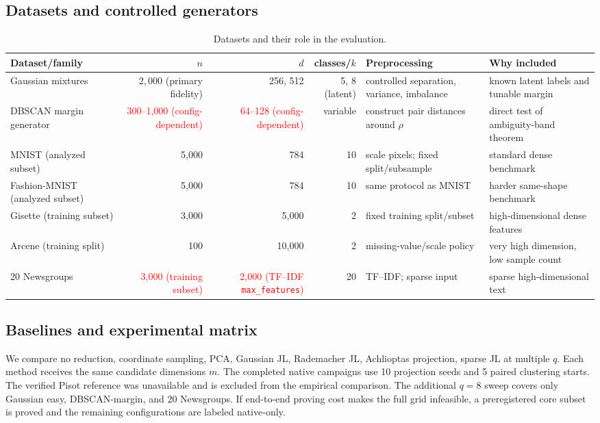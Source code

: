 \documentclass[pdflatex,sn-mathphys-num,iicol]{sn-jnl}
\newcommand{\newtext}[1]{\textcolor{red}{#1}}
\newcommand{\tpexplain}[1]{}
\theoremstyle{plain}
\theoremstyle{definition}
\theoremstyle{remark}
\begin{document}
\subsection{Datasets and controlled generators}
\begin{table}[!htbp]
\caption{Datasets and their role in the evaluation.}\label{tab:datasets-a}
\centering\scriptsize
\begin{adjustbox}{max width=\textwidth}
\begin{tabularx}{\textwidth}{@{}Y R R R Y Y@{}}
\toprule
Dataset/family & $n$ & $d$ & classes/$k$ & Preprocessing & Why included \\
\midrule
Gaussian mixtures & $2{,}000$ (primary fidelity) & 256, 512 & 5, 8 (latent) & controlled separation, variance, imbalance & known latent labels and tunable margin \\
DBSCAN margin generator & \newtext{300--1{,}000 (config-dependent)} & \newtext{64--128 (config-dependent)} & variable & construct pair distances around $\rho$ & direct test of ambiguity-band theorem \\
MNIST (analyzed subset) & 5,000 & 784 & 10 & scale pixels; fixed split/subsample & standard dense benchmark \\
Fashion-MNIST (analyzed subset) & 5,000 & 784 & 10 & same protocol as MNIST & harder same-shape benchmark \\
Gisette (training subset) & 3,000 & 5,000 & 2 & fixed training split/subset & high-dimensional dense features \\
Arcene (training split) & 100 & 10,000 & 2 & missing-value/scale policy & very high dimension, low sample count \\
20 Newsgroups & \newtext{3,000 (training subset)} & \newtext{2,000 (TF--IDF \texttt{max\_features})} & 20 & TF--IDF; sparse input & sparse high-dimensional text \\
\bottomrule
\end{tabularx}
\end{adjustbox}
\end{table}

\subsection{Baselines and experimental matrix}
\tpexplain{Fix hyperparameter budgets fairly. PCA must include both “projection matrix public” and “PCA itself proved” interpretations if both are discussed.}
We compare no reduction, coordinate sampling, PCA, Gaussian JL, Rademacher JL, Achlioptas projection, sparse JL at multiple $q$. Each method receives the same candidate dimensions $m$. The completed native campaigns use 10 projection seeds and 5 paired clustering starts. The verified Pisot reference was unavailable and is excluded from the empirical comparison. The additional $q=8$ sweep covers only Gaussian easy, DBSCAN-margin, and 20 Newsgroups. If end-to-end proving cost makes the full grid infeasible, a preregistered core subset is proved and the remaining configurations are labeled native-only.
\end{document}
